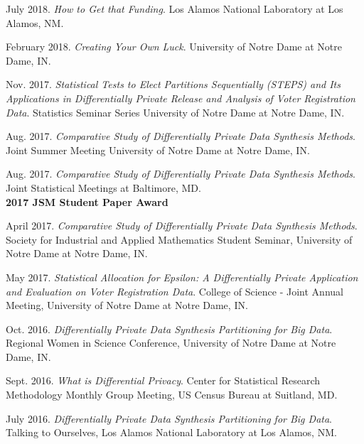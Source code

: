 \documentclass[11pt, letterpaper, roman]{moderncv} %
\begin{document}
\begin{etaremune}[topsep=0pt, itemsep=5pt, partopsep=0pt, parsep=0pt]
    \item July 2018. \textit{How to Get that Funding}. Los Alamos National Laboratory at Los Alamos, NM.
    
    \item February 2018. \textit{Creating Your Own Luck}. University of Notre Dame at Notre Dame, IN.
    
    \item Nov. 2017. \textit{Statistical Tests to Elect Partitions Sequentially (STEPS) and Its Applications in Differentially Private Release and Analysis of Voter Registration Data}. Statistics Seminar Series University of Notre Dame at Notre Dame, IN.
    
    \item Aug. 2017. \textit{Comparative Study of Differentially Private Data Synthesis Methods}. Joint Summer Meeting University of Notre Dame at Notre Dame, IN.
    
    \item Aug. 2017. \textit{Comparative Study of Differentially Private Data Synthesis Methods}. Joint Statistical Meetings at Baltimore, MD.\\
    \textbf{2017 JSM Student Paper Award}
    
    \item April 2017. \textit{Comparative Study of Differentially Private Data Synthesis Methods}. Society for Industrial and Applied Mathematics Student Seminar, University of Notre Dame at Notre Dame, IN.
    
    \item May 2017. \textit{Statistical Allocation for Epsilon: A Differentially Private Application and Evaluation on Voter Registration Data}. College of Science - Joint Annual Meeting, University of Notre Dame at Notre Dame, IN.
    
    \item Oct. 2016. \textit{Differentially Private Data Synthesis Partitioning for Big Data}. Regional Women in Science Conference, University of Notre Dame at Notre Dame, IN. 
    
    \item Sept. 2016. \textit{What is Differential Privacy}. Center for Statistical Research Methodology Monthly Group Meeting, US Census Bureau at Suitland, MD. 
    
    \item July 2016. \textit{Differentially Private Data Synthesis Partitioning for Big Data}. Talking to Ourselves, Los Alamos National Laboratory at Los Alamos, NM.
    

\end{etaremune}
\end{document}
